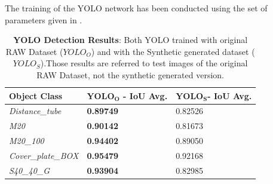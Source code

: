 The training of the YOLO network has been conducted using the set of parameters given in .


\begin{table}
	\centering
    \begin{tabular}{| l | l | l |}
    \hline
    \textbf{Object Class} & \textbf{$\pmb{YOLO_O}$ - IoU Avg.} & \textbf{$\pmb{YOLO_S}$- IoU Avg.}\\ \hline
    \emph{Distance\_tube} & \textbf{0.89749} & 0.82526 \\
    \emph{M20} & \textbf{0.90142} & 0.81673 \\
    \emph{M20\_100} & \textbf{0.94402} & 0.89050 \\
    \emph{Cover\_plate\_BOX} & \textbf{0.95479} & 0.92168 \\
    \emph{S40\_40\_G} & \textbf{0.93904} & 0.82985 \\
    \hline
    \end{tabular}
    \caption{\textbf{YOLO Detection Results}: Both YOLO trained with original RAW Dataset ($YOLO_O$) and with the Synthetic generated dataset ($YOLO_S$).Those results are referred to test images of the original RAW Dataset, not the synthetic generated version.}
    \label{tab:dl_YOLO_results_unified}
\end{table}

